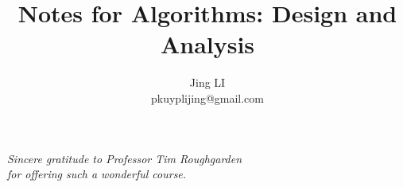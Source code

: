 
\def\PREAMBLE{PREAMBLE}
\title{Notes for Algorithms: Design and Analysis}
\author{Jing LI\\pkuyplijing@gmail.com}


\pagestyle{empty}
\hypersetup{pageanchor=false}
\maketitle
\begin{center}
\emph{Sincere gratitude to Professor Tim Roughgarden \\for offering such a wonderful course.}
\end{center}
\tableofcontents
\newpage
\hypersetup{pageanchor=true}
\pagestyle{headings}








\clearpage%
{}
\listofalgorithms
